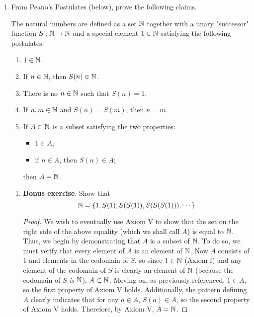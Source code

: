 \documentclass[../main.tex]{subfiles}
\begin{document}
\begin{enumerate}
\begin{proof}
\begin{align*}
            &= \sum_{k=0}^{n+1}\binom{n+1}{k}x^{(n+1)-k}y^k
        \end{align*}
        This closes the induction.
    \end{proof}
    \item From Peano's Postulates (below), prove the following claims.
    \begin{axioms}
        The natural numbers are defined as a set $\mathbb{N}$ together with a unary "successor" function $S:\mathbb{N}\to\mathbb{N}$ and a special element $1\in\mathbb{N}$ satisfying the following postulates.
        \begin{enumerate}[label={\Roman*.}]
            \item $1\in\mathbb{N}$.
            \item If $n\in\mathbb{N}$, then $S(n)\in\mathbb{N}$.
            \item There is no $n\in\mathbb{N}$ such that $S(n)=1$.
            \item If $n,m\in\mathbb{N}$ and $S(n)=S(m)$, then $n=m$.
            \item If $A\subset\mathbb{N}$ is a subset satisfying the two properties:
            \begin{itemize}
                \item $1\in A$;
                \item if $n\in A$, then $S(n)\in A$;
            \end{itemize}
            then $A=\mathbb{N}$.
        \end{enumerate}
    \end{axioms}
    \begin{enumerate}[label={(\alph*)}]
        \item \textbf{Bonus exercise}. Show that
        \begin{equation*}
            \mathbb{N} = \{1,S(1),S(S(1)),S(S(S(1))),\cdots\}
        \end{equation*}
        \begin{proof}
            We wish to eventually use Axiom V to show that the set on the right side of the above equality (which we shall call $A$) is equal to $\mathbb{N}$. Thus, we begin by demonstrating that $A$ is a subset of $\mathbb{N}$. To do so, we must verify that every element of $A$ is an element of $\mathbb{N}$. Now $A$ consists of 1 and elements in the codomain of $S$, so since $1\in\mathbb{N}$ (Axiom I) and any element of the codomain of $S$ is clearly an element of $\mathbb{N}$ (because the codomain of $S$ \emph{is} $\mathbb{N}$), $A\subset\mathbb{N}$. Moving on, as previously referenced, $1\in A$, so the first property of Axiom V holds. Additionally, the pattern defining $A$ clearly indicates that for any $a\in A$, $S(a)\in A$, so the second property of Axiom V holds. Therefore, by Axiom V, $A=\mathbb{N}$.

\end{proof}
\end{enumerate}
\end{enumerate}
\end{document}
